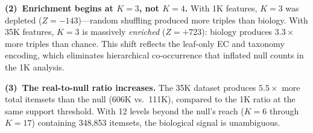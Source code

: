 \textbf{(2)~Enrichment begins at $K{=}3$, not $K{=}4$.}
With 1K features, $K{=}3$ was depleted ($Z{=}{-}143$)---random shuffling
produced more triples than biology. With 35K features, $K{=}3$ is massively
\emph{enriched} ($Z{=}+723$): biology produces $3.3\times$ more triples
than chance. This shift reflects the leaf-only EC and taxonomy encoding,
which eliminates hierarchical co-occurrence that inflated null counts in the
1K analysis.

\textbf{(3)~The real-to-null ratio increases.}
The 35K dataset produces $5.5\times$ more total itemsets than the null
(606K vs.\ 111K), compared to the 1K ratio at the same support threshold.
With 12 levels beyond the null's reach ($K{=}6$ through $K{=}17$)
containing 348,853 itemsets, the biological signal is unambiguous.


\begin{table}[t]
\caption{35K null model: 100-permutation results (\textbf{TBD}).
GPU-accelerated Fisher--Yates shuffle on 4$\times$H200, ${\sim}655$\,s per
permutation.}
\label{tab:null-model-35k-100}
\centering
{}
\end{table}


%

